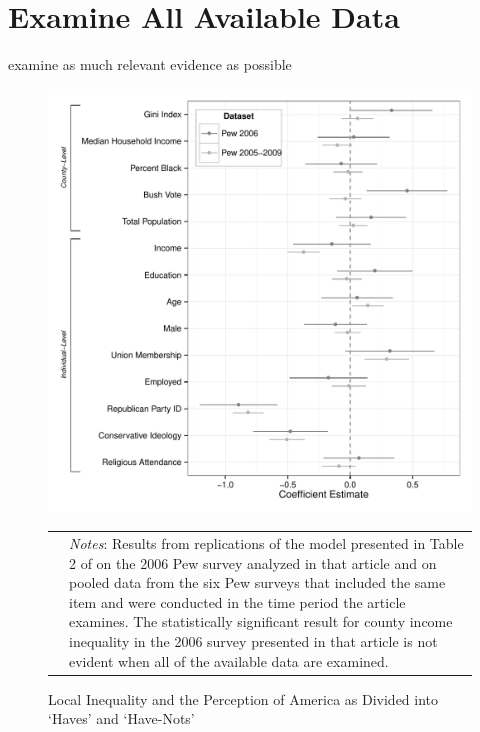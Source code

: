 
\section{Examine All Available Data}

examine as much relevant evidence as possible

\begin{figure}[htbp] 
  \caption{Local Inequality and the Perception of America as Divided into `Haves' and `Have-Nots'}
  \label{F:coef.t1m1}
  \begin{center}
    \includegraphics[width=5.25in]{../figures/03_examine_all_available_data_t2.pdf}
  \end{center}
  \begin{footnotesize}
  \begin{tabular}{p{.1in} p{5.1in}}
  & \emph{Notes}: Results from replications of the model presented in Table 2 of \citet{Newman2015} on the 2006 Pew survey analyzed in that article and on pooled data from the six Pew surveys that included the same item and were conducted in the time period the article examines.  The statistically significant result for county income inequality in the 2006 survey presented in that article is not evident when all of the available data are examined.
  \end{tabular}
  \end{footnotesize}
\end{figure}

